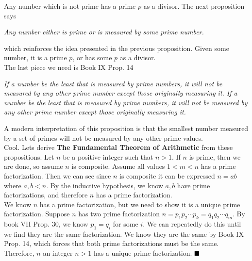 \documentclass[10pt]{article}
\begin{document}
\begin{enumerate}
         Any number which is not prime has a prime $p$ as a divisor. The next proposition says

        \begin{center}
            \textit{Any number either is prime or is measured by some prime number.}
        \end{center}

        which reinforces the idea presented in the previous proposition. Given some number, it is a prime $p$, or has some $p$ as a divisor.\\

        The last piece we need is Book IX Prop. 14

        \begin{center}
            \textit{If a number be the least that is measured by prime numbers, it will not be measured by any other prime number except those originally measuring it. If a number be the least that is measured by prime numbers, it will not be measured by any other prime number except those originally measuring it.}
        \end{center}
        
        A modern interpretation of this proposition is that the smallest number measured by a set of primes will not be measured by any other prime values.\\

        Cool. Lets derive \textbf{The Fundamental Theorem of Arithmetic} from these propositions. Let $n$ be a positive integer such that $n > 1$. If $n$ is prime, then we are done, so assume $n$ is composite. Assume all values $1 < m < n$ has a prime factorization. Then we can see since $n$ is composite it can be expressed $n = ab$ where $a,b < n$. By the inductive hypothesis, we know $a,b$ have prime factorizations, and therefore $n$ has a prime factorization.\\

        We know $n$ has a prime factorization, but we need to show it is a unique prime factorization. Suppose $n$ has two prime factorization $n = p_1p_2 \cdots p_k = q_1q_2 \cdots q_m$. By book VII Prop. 30, we know $p_1 = q_i$ for some $i$. We can repeatedly do this until we find they are the same factorization. We know they are the same by Book IX Prop. 14, which forces that both prime factorizations must be the same. Therefore, $n$ an integer $n > 1$ has a unique prime factorization. $\hfill\blacksquare$
		
	\end{enumerate}


\noindent \underline{\hspace{3in}}\\
\end{document}
